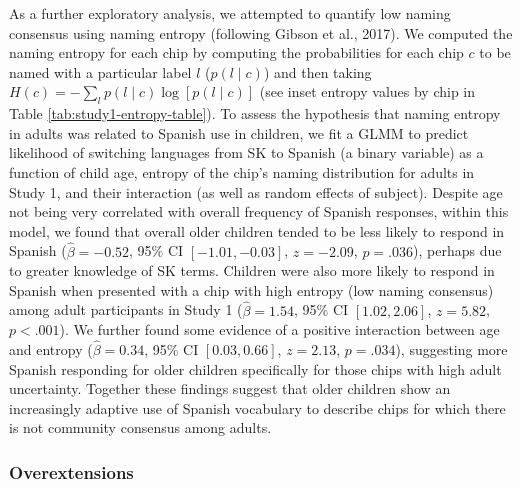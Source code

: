 \documentclass[
  english,
  ,man,floatsintext]{apa6}
\begin{document}
As a further exploratory analysis, we attempted to quantify low naming consensus using naming entropy (following Gibson et al., 2017). We computed the naming entropy for each chip by computing the probabilities for each chip \(c\) to be named with a particular label \(l\) (\(p(l \mid c)\)) and then taking \(H(c) = -\sum_{l}{p(l\mid c) \log[p(l \mid c)]}\) (see inset entropy values by chip in Table \ref{tab:study1-entropy-table}).
To assess the hypothesis that naming entropy in adults was related to Spanish use in children, we fit a GLMM to predict likelihood of switching languages from SK to Spanish (a binary variable) as a function of child age, entropy of the chip's naming distribution for adults in Study 1, and their interaction (as well as random effects of subject). Despite age not being very correlated with overall frequency of Spanish responses, within this model, we found that overall older children tended to be less likely to respond in Spanish (\(\hat{\beta} = -0.52\), 95\% CI \([-1.01, -0.03]\), \(z = -2.09\), \(p = .036\)), perhaps due to greater knowledge of SK terms. Children were also more likely to respond in Spanish when presented with a chip with high entropy (low naming consensus) among adult participants in Study 1 (\(\hat{\beta} = 1.54\), 95\% CI \([1.02, 2.06]\), \(z = 5.82\), \(p < .001\)). We further found some evidence of a positive interaction between age and entropy (\(\hat{\beta} = 0.34\), 95\% CI \([0.03, 0.66]\), \(z = 2.13\), \(p = .034\)), suggesting more Spanish responding for older children specifically for those chips with high adult uncertainty. Together these findings suggest that older children show an increasingly adaptive use of Spanish vocabulary to describe chips for which there is not community consensus among adults.

\hypertarget{overextensions}{%
\subsubsection{Overextensions}\label{overextensions}}
\end{document}
